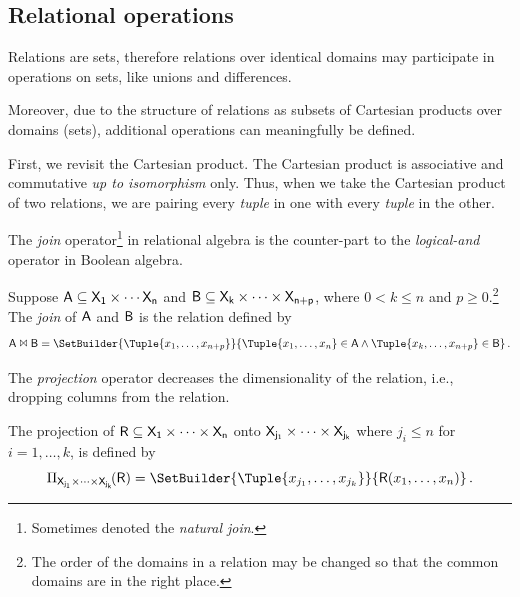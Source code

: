 \documentclass[11pt,final,hidelinks]{article}
\begin{document}
\subsection{Relational operations}
Relations are sets, therefore relations over identical domains may participate in operations on sets, like unions and differences.

Moreover, due to the structure of relations as subsets of Cartesian products over domains (sets), additional operations can meaningfully be defined.

First, we revisit the Cartesian product. The Cartesian product is associative and commutative \emph{up to isomorphism} only. Thus, when we take the Cartesian product of two relations, we are pairing every \emph{tuple} in one with every \emph{tuple} in the other.



The \emph{join} operator\footnote{Sometimes denoted the \emph{natural join}.} in relational algebra is the counter-part to the \emph{logical-and} operator in Boolean algebra.
\begin{definition}
Suppose $\Relation{A} \subseteq \Set{X}[1] \times \cdots \Set{X}[n]$ and $\Relation{B} \subseteq \Set{X}[k] \times \cdots \times \Set{X}[n+p]$, where $0 < k \leq n$ and $p \geq 0$.\footnote{The order of the domains in a relation may be changed so that the common domains are in the right place.} The \emph{join} of $\Relation{A}$ and $\Relation{B}$ is the relation defined by
\begin{equation}
    \Relation{A} \Join \Relation{B} = \SetBuilder{ \Tuple{x_1,\ldots,x_{n+p}} }{ \Tuple{x_1,\ldots,x_n} \in \Relation{A} \land \Tuple{x_k,\ldots,x_{n+p}} \in \Relation{B}}\,.
\end{equation}
\end{definition}

The \emph{projection} operator decreases the dimensionality of the relation, i.e., dropping columns from the relation.
\begin{definition}
The projection of $\Relation{R} \subseteq \Set{X}[1] \times \cdots \times \Set{X}[n]$ onto $\Set{X}[j_1] \times \cdots \times \Set{X}[j_k]$ where $j_i \leq n$ for $i=1,\ldots,k$, is defined by
\begin{equation}
   \Proj_{\Set{X}[j_1] \times \cdots \times \Set{X}[j_k]}\!(\Relation{R}) = \SetBuilder
   {\Tuple{x_{j_1},\ldots,x_{j_k}}}{\Relation{R}(x_1,\ldots,x_n)}\,.
\end{equation}
\end{definition}
\end{document}
